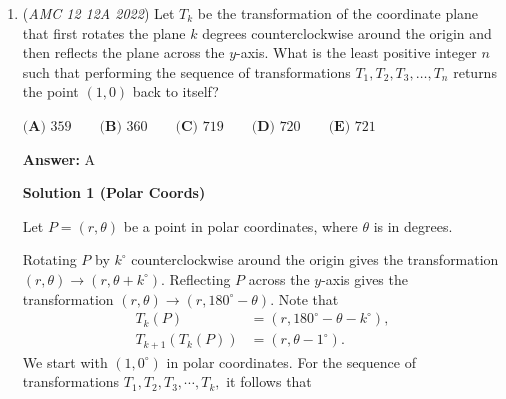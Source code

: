 \begin{enumerate}
 


 



\textbf{Solution 4}

We are given
 \[a(\sin x+\sin 2x)=\sin 3x,\]where $0<x<\pi$.

 Using the identities
 \[\sin 2x=2\sin x\cos x\]and
 \[\sin 3x=\sin x(4\cos^2x-1),\]we obtain
 \[a\sin x(1+2\cos x)=\sin x(4\cos^2x-1).\]

 Since $0<x<\pi$, we have $\sin x\ne0$. Dividing by $\sin x$ and factoring gives
 \[a(1+2\cos x)=(2\cos x-1)(2\cos x+1),\]so
 \[(2\cos x+1)(2\cos x-1-a)=0.\]

 Therefore,
 \[\cos x=-\frac12 \qquad\text{or}\qquad \cos x=\frac{a+1}{2}.\]

 The first equation always has the solution $x=\frac{2\pi}{3}$.

 For the second equation to have a solution in $(0,\pi)$, we require
 \[-1<\frac{a+1}{2}<1,\]which simplifies to
 \[-3<a<1.\]

 However, the two solutions coincide when
 \[\frac{a+1}{2}=-\frac12,\]giving $a=-2$.

 Thus, the equation has more than one distinct solution precisely when
 \[a\in(-3,-2)\cup(-2,1).\]

 Hence $p=-3$, $q=-2$, and $r=1$, so
 \[\boxed{\textbf{(A)}\ p+q+r=-3-2+1=-4}.\]



	\item (\textit{AMC 12 12A 2022}) Let $T_k$ be the transformation of the coordinate plane that first rotates the plane $k$ degrees counterclockwise around the origin and then reflects the plane across the $y$-axis. What is the least positive integer $n$ such that performing the sequence of transformations $T_1, T_2, T_3, \dots, T_n$ returns the point $(1,0)$ back to itself?


 $\textbf{(A) } 359 \qquad \textbf{(B) } 360\qquad \textbf{(C) } 719 \qquad \textbf{(D) } 720 \qquad \textbf{(E) } 721$

 \textbf{Answer: }A



\textbf{Solution 1 (Polar Coords)}

Let $P=(r,\theta)$ be a point in polar coordinates, where $\theta$ is in degrees.

 Rotating $P$ by $k^{\circ}$ counterclockwise around the origin gives the transformation $(r,\theta)\rightarrow(r,\theta+k^{\circ}).$ Reflecting $P$ across the $y$-axis gives the transformation $(r,\theta)\rightarrow(r,180^{\circ}-\theta).$ Note that 
 \begin{align*} T_k(P)&=(r,180^{\circ}-\theta-k^{\circ}), \\ T_{k+1}(T_k(P)) &= (r,\theta -1^{\circ}). \end{align*}
We start with $(1,0^{\circ})$ in polar coordinates. For the sequence of transformations $T_1, T_2, T_3, \cdots, T_k,$ it follows that


\end{enumerate}

